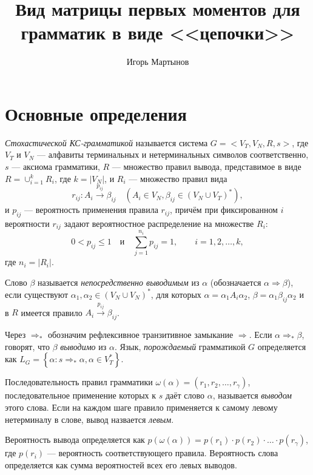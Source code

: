 \documentclass[11pt]{article}
\title{Вид матрицы первых моментов для грамматик в виде <<цепочки>>}
\author{Игорь Мартынов}
\begin{document}
\setlength{\parindent}{0pt}
\setlength{\parskip}{8pt}

\maketitle

\section{Основные определения}

\textit{Стохастической КС-грамматикой} называется система $G = <V_T, V_N, R, s>$, где $V_T$ и $V_N$ --- алфавиты терминальных и нетерминальных символов соответственно, $s$ --- аксиома грамматики, $R$ --- множество правил вывода, представимое в виде $R = \cup_{i = 1}^k R_i$, где $k = |V_N|$, и $R_i$ --- множество правил вида
\begin{equation}
    r_{ij} : A_i \xrightarrow{p_{ij}} \beta_{ij}\quad{}\left( A_i \in V_N, \beta_{ij} \in (V_N \cup V_T)^* \right),
\end{equation}
и $p_{ij}$ --- вероятность применения правила $r_{ij}$, причём при фиксированном $i$ вероятности $r_{ij}$ задают вероятностное распределение на множестве $R_i$:
\begin{equation}
    0 < p_{ij} \le 1\quad\text{и}\quad\sum_{j = 1}^{n_i} p_{ij} = 1,\qquad{}i = 1,2,\ldots,k,
\end{equation}
где $n_i = |R_i|$.

Слово $\beta$ называется \textit{непосредственно выводимым} из $\alpha$ (обозначается $\alpha \Rightarrow \beta$), если существуют $\alpha_1, \alpha_2 \in (V_N \cup V_N)^*$, для которых $\alpha = \alpha_1 A_i \alpha_2$, $\beta = \alpha_1 \beta_{ij} \alpha_2$ и в $R$ имеется правило $A_i \xrightarrow{p_{ij}} \beta_{ij}$.

Через $\Rightarrow_*$ обозначим рефлексивное транзитивное замыкание $\Rightarrow$. Если $\alpha \Rightarrow_* \beta$, говорят, что $\beta$ \textit{выводимо} из $\alpha$. Язык, \textit{порождаемый} грамматикой $G$ определяется как $L_G = \left\{ \alpha : s \Rightarrow_* \alpha, \alpha \in V_T^* \right\}$.

Последовательность правил грамматики $\omega(\alpha) = (r_1, r_2, \ldots, r_\gamma)$, последовательное применение которых к $s$ даёт слово $\alpha$, называется \textit{выводом} этого слова. Если на каждом шаге правило применяется к самому левому нетерминалу в слове, вывод назвается \textit{левым}.

Вероятность вывода определяется как $p(\omega(\alpha)) = p(r_1) \cdot p(r_2) \cdot \ldots \cdot p(r_\gamma)$, где $p(r_i)$ --- вероятность соответствующего правила. Вероятность слова определяется как сумма вероятностей всех его левых выводов.
\end{document}
